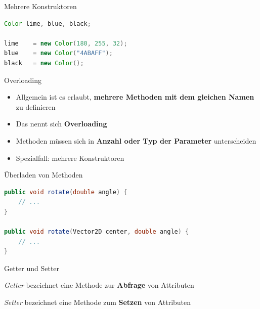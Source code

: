 \documentclass[18pt]{beamer}
\begin{document}
\begin{frame}[fragile]{Mehrere Konstruktoren}
    \begin{lstlisting}[language=Java]
Color lime, blue, black;

lime    = new Color(180, 255, 32);
blue    = new Color("4ABAFF");
black   = new Color();
    \end{lstlisting}

\end{frame}


\begin{frame}{Overloading}
    \begin{itemize}
        \item Allgemein ist es erlaubt, \textbf{mehrere Methoden mit dem gleichen Namen} zu definieren
        \item Das nennt sich \textbf{Overloading}
        \item Methoden müssen sich in \textbf{Anzahl oder Typ der Parameter} unterscheiden
        \item Spezialfall: mehrere Konstruktoren
    \end{itemize}
\end{frame}


\begin{frame}[fragile]{Überladen von Methoden}
    \begin{exampleblock}{}
        \begin{lstlisting}[language=Java]
public void rotate(double angle) {
    // ...
}

public void rotate(Vector2D center, double angle) {
    // ...
}
        \end{lstlisting}
    \end{exampleblock}
\end{frame}

\appendix

\beginbackup

\begin{frame}{Getter und Setter}
    \begin{block}{}
        \textit{Getter} bezeichnet eine Methode zur \textbf{Abfrage} von Attributen
    \end{block}

    \begin{block}{}
        \textit{Setter} bezeichnet eine Methode zum \textbf{Setzen} von Attributen
    \end{block}
\end{frame}
\end{document}
